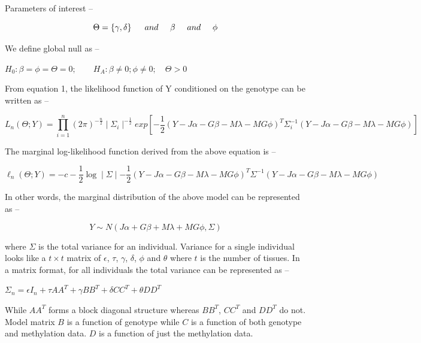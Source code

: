 \documentclass[hidelinks]{article}
\begin{document}
Parameters of interest --

\[
\Large
\Theta = \left\{ \gamma, \delta \right\} \quad and \quad \beta \quad and \quad \phi
\]

We define global null as --

\begingroup
\large
\begin{center}
$
\boxed{
H_0: \beta = \phi = \Theta = 0; \qquad H_A: \beta \neq 0; \phi \neq 0; \quad \Theta > 0
}
$
\end{center}
\endgroup

From equation 1, the likelihood function of Y conditioned on the genotype can be written as --

\begin{equation}
L_n\left( \Theta; Y \right) = \prod\limits_{i=1}^n \left( 2 \pi \right) ^{-\frac{n}{2}} \mid \Sigma_{i} \mid ^{-\frac{1}{2}} exp \left[ -\frac{1}{2} \left( Y  - J \alpha -  G\beta - M\lambda - MG\phi \right)^T \Sigma_{i}^{-1} \left( Y  - J \alpha -  G\beta - M\lambda - MG\phi \right) \right]
\end{equation}

The marginal log-likelihood function derived from the above equation is --

\begin{equation}
\ell_n\left( \Theta ;Y \right) =  - c - \frac{1}{2} \log \mid \Sigma \mid - \frac{1}{2} \left( Y  - J \alpha - G\beta - M\lambda - MG\phi \right )^T \Sigma ^{-1} \left( Y  - J \alpha - G\beta - M\lambda - MG\phi \right )
\end{equation}

In other words, the marginal distribution of the above model can be represented as --

\[
Y \sim N( J\alpha + G\beta + M\lambda + MG\phi,\Sigma )
\]

where $\Sigma$ is the total variance for an individual. Variance for a single individual looks like a $t \times t$ matrix of $\epsilon$, $\tau$, $\gamma$, $\delta$, $\phi$ and $\theta$ where $t$ is the number of tissues. In a matrix format, for all individuals the total variance can be represented as  --

\begin{center}
$
\boxed{
\Sigma_{n}  = \epsilon I_n + \tau A A^{T} + \gamma B B^{T} + \delta C C^T + \theta D D^T 
}
$
\end{center}

While $AA^T$ forms a block diagonal structure whereas $BB^T$, $CC^T$ and $DD^T$ do not. Model matrix $B$ is a function of genotype while $C$ is a function of both genotype and methylation data. $D$ is a function of just the methylation data. 
\end{document}
